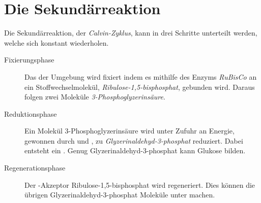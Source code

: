 \documentclass{article}
\begin{document}
\section{Die Sekundärreaktion}
Die Sekundärreaktion, der \emph{Calvin-Zyklus}, kann in drei Schritte unterteilt werden, welche sich konstant wiederholen.
\begin{description}
 \item[Fixierungsphase] Das  der Umgebung wird fixiert indem es mithilfe des Enzyms \emph{RuBisCo} an ein Stoffwechselmolekül, \emph{Ribulose-1,5-bisphosphat}, gebunden wird. Daraus folgen zwei Moleküle \emph{3-Phosphoglyzerinsäure}.
 \item[Reduktionsphase] Ein Molekül 3-Phosphoglyzerinsäure wird unter Zufuhr an Energie, gewonnen durch  und , zu \emph{Glyzerinaldehyd-3-phosphat} reduziert. Dabei entsteht ein . Genug Glyzerinaldehyd-3-phosphat kann Glukose bilden.
 \item[Regenerationsphase] Der -Akzeptor Ribulose-1,5-bisphosphat wird regeneriert. Dies können die übrigen Glyzerinaldehyd-3-phosphat Moleküle unter  machen.
\end{description} 
\end{document}

